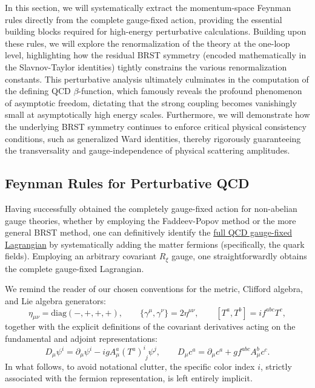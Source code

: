 In this section, we will systematically extract the momentum-space Feynman rules directly from the complete gauge-fixed action, providing the essential building blocks required for high-energy perturbative calculations. Building upon these rules, we will explore the renormalization of the theory at the one-loop level, highlighting how the residual BRST symmetry (encoded mathematically in the Slavnov-Taylor identities) tightly constrains the various renormalization constants. This perturbative analysis ultimately culminates in the computation of the defining QCD \(\beta\)-function, which famously reveals the profound phenomenon of asymptotic freedom, dictating that the strong coupling becomes vanishingly small at asymptotically high energy scales. Furthermore, we will demonstrate how the underlying BRST symmetry continues to enforce critical physical consistency conditions, such as generalized Ward identities, thereby rigorously guaranteeing the transversality and gauge-independence of physical scattering amplitudes.

\subsection{Feynman Rules for Perturbative QCD}

Having successfully obtained the completely gauge-fixed action for non-abelian gauge theories, whether by employing the Faddeev-Popov method or the more general BRST method, one can definitively identify the \uline{full QCD gauge-fixed Lagrangian} by systematically adding the matter fermions (specifically, the quark fields). Employing an arbitrary covariant $R_\xi$ gauge, one straightforwardly obtains the complete gauge-fixed Lagrangian.

We remind the reader of our chosen conventions for the metric, Clifford algebra, and Lie algebra generators:
\[\eta_{\mu\nu} = \text{diag}(-, +, +, +), \qquad \{\gamma^\mu, \gamma^\nu\} = 2\eta^{\mu\nu}, \qquad [T^a, T^b] = i f^{abc} T^c,\]
together with the explicit definitions of the covariant derivatives acting on the fundamental and adjoint representations:
\[D_\mu\psi^i = \partial_\mu\psi^i - i g A_\mu^a (T^a)^i_{\phantom{i}j} \psi^j, \qquad D_\mu c^a = \partial_\mu c^a + g f^{abc} A_\mu^b c^c.\]
In what follows, to avoid notational clutter, the specific color index $i$, strictly associated with the fermion representation, is left entirely implicit.

